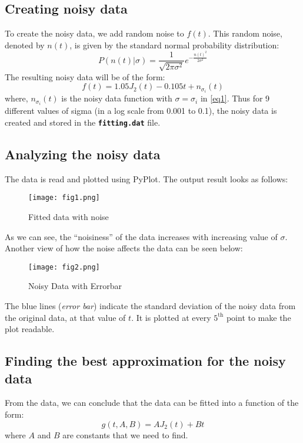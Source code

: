 \documentclass[11pt, a4paper]{article}
\begin{document}
        \subsection{Creating noisy data}
            To create the noisy data, we add random noise to $f(t)$. This random noise, denoted by $n(t)$, is given by the standard normal probability distribution:
            \begin{equation}
                P(n(t)|\sigma)=\frac{1}{\sqrt{2\pi\sigma^2}}e^{-\frac{n(t)^2}{2\sigma^2}} \label{eq1}
            \end{equation}
            The resulting noisy data will be of the form:
            \begin{equation}
                f(t) = 1.05J_2(t)-0.105t+n_{\sigma_i}(t)
            \end{equation}
            where, $n_{\sigma_i}(t)$ is the noisy data function with $\sigma = \sigma_{i}$ in \eqref{eq1}. Thus for 9 different values of sigma (in a log scale from 0.001 to 0.1), the noisy data is created and stored in the \texttt{\textbf{fitting.dat}} file.

        \subsection{Analyzing the noisy data}
            The data is read and plotted using PyPlot. The output result looks as follows:
            \begin{figure}[H]
                \centering
                \texttt{[image: fig1.png]}
                \caption{Fitted data with noise}
                \label{fig:noisyAndTrue}
            \end{figure}

            As we can see, the ``noisiness'' of the data increases with increasing value of $\sigma$. Another view of how the noise affects the data can be seen below:
            \begin{figure}[H]
                \centering
                \texttt{[image: fig2.png]}
                \caption{Noisy Data with Errorbar}
                \label{fig:noiseError}
            \end{figure}

            The blue lines (\textit{error bar}) indicate the standard deviation of the noisy data from the original data, at that value of $t$. It is plotted at every $5^\text{th}$ point to make the plot readable.

        \subsection{Finding the best approximation for the noisy data}
            From the data, we can conclude that the data can be fitted into a function of the form:
            \begin{equation}
                g(t, A, B) = AJ_2(t)+Bt
            \end{equation}
            where $A$ and $B$ are constants that we need to find.\\
\end{document}
